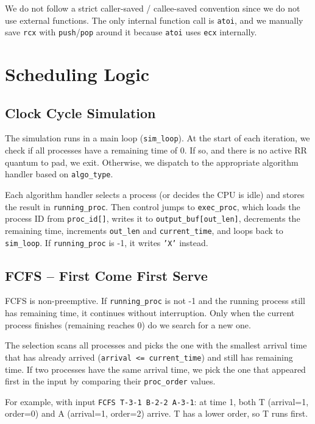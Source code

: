 \documentclass[a4paper,12pt]{article}
\begin{document}
We do not follow a strict caller-saved / callee-saved convention since we do not use external functions. The only internal function call is \texttt{atoi}, and we manually save \texttt{rcx} with \texttt{push}/\texttt{pop} around it because \texttt{atoi} uses \texttt{ecx} internally.

\section{Scheduling Logic}

\subsection{Clock Cycle Simulation}

The simulation runs in a main loop (\texttt{sim\_loop}). At the start of each iteration, we check if all processes have a remaining time of 0. If so, and there is no active RR quantum to pad, we exit. Otherwise, we dispatch to the appropriate algorithm handler based on \texttt{algo\_type}.

Each algorithm handler selects a process (or decides the CPU is idle) and stores the result in \texttt{running\_proc}. Then control jumps to \texttt{exec\_proc}, which loads the process ID from \texttt{proc\_id[]}, writes it to \texttt{output\_buf[out\_len]}, decrements the remaining time, increments \texttt{out\_len} and \texttt{current\_time}, and loops back to \texttt{sim\_loop}. If \texttt{running\_proc} is -1, it writes \texttt{'X'} instead.

\subsection{FCFS -- First Come First Serve}

FCFS is non-preemptive. If \texttt{running\_proc} is not -1 and the running process still has remaining time, it continues without interruption. Only when the current process finishes (remaining reaches 0) do we search for a new one.

The selection scans all processes and picks the one with the smallest arrival time that has already arrived (\texttt{arrival <= current\_time}) and still has remaining time. If two processes have the same arrival time, we pick the one that appeared first in the input by comparing their \texttt{proc\_order} values.

For example, with input \texttt{FCFS T-3-1 B-2-2 A-3-1}: at time 1, both T (arrival=1, order=0) and A (arrival=1, order=2) arrive. T has a lower order, so T runs first.
\end{document}

